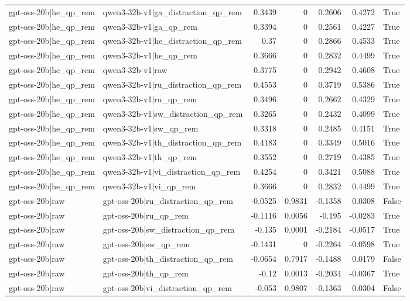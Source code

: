 \begin{table}
\begin{tabular}{l l r r r r l}
gpt-oss-20b|he_qp_rem & qwen3-32b-v1|ga_distraction_qp_rem & 0.3439 & 0 & 0.2606 & 0.4272 & True \\
gpt-oss-20b|he_qp_rem & qwen3-32b-v1|ga_qp_rem & 0.3394 & 0 & 0.2561 & 0.4227 & True \\
gpt-oss-20b|he_qp_rem & qwen3-32b-v1|he_distraction_qp_rem & 0.37 & 0 & 0.2866 & 0.4533 & True \\
gpt-oss-20b|he_qp_rem & qwen3-32b-v1|he_qp_rem & 0.3666 & 0 & 0.2832 & 0.4499 & True \\
gpt-oss-20b|he_qp_rem & qwen3-32b-v1|raw & 0.3775 & 0 & 0.2942 & 0.4608 & True \\
gpt-oss-20b|he_qp_rem & qwen3-32b-v1|ru_distraction_qp_rem & 0.4553 & 0 & 0.3719 & 0.5386 & True \\
gpt-oss-20b|he_qp_rem & qwen3-32b-v1|ru_qp_rem & 0.3496 & 0 & 0.2662 & 0.4329 & True \\
gpt-oss-20b|he_qp_rem & qwen3-32b-v1|sw_distraction_qp_rem & 0.3265 & 0 & 0.2432 & 0.4099 & True \\
gpt-oss-20b|he_qp_rem & qwen3-32b-v1|sw_qp_rem & 0.3318 & 0 & 0.2485 & 0.4151 & True \\
gpt-oss-20b|he_qp_rem & qwen3-32b-v1|th_distraction_qp_rem & 0.4183 & 0 & 0.3349 & 0.5016 & True \\
gpt-oss-20b|he_qp_rem & qwen3-32b-v1|th_qp_rem & 0.3552 & 0 & 0.2719 & 0.4385 & True \\
gpt-oss-20b|he_qp_rem & qwen3-32b-v1|vi_distraction_qp_rem & 0.4254 & 0 & 0.3421 & 0.5088 & True \\
gpt-oss-20b|he_qp_rem & qwen3-32b-v1|vi_qp_rem & 0.3666 & 0 & 0.2832 & 0.4499 & True \\
gpt-oss-20b|raw & gpt-oss-20b|ru_distraction_qp_rem & -0.0525 & 0.9831 & -0.1358 & 0.0308 & False \\
gpt-oss-20b|raw & gpt-oss-20b|ru_qp_rem & -0.1116 & 0.0056 & -0.195 & -0.0283 & True \\
gpt-oss-20b|raw & gpt-oss-20b|sw_distraction_qp_rem & -0.135 & 0.0001 & -0.2184 & -0.0517 & True \\
gpt-oss-20b|raw & gpt-oss-20b|sw_qp_rem & -0.1431 & 0 & -0.2264 & -0.0598 & True \\
gpt-oss-20b|raw & gpt-oss-20b|th_distraction_qp_rem & -0.0654 & 0.7917 & -0.1488 & 0.0179 & False \\
gpt-oss-20b|raw & gpt-oss-20b|th_qp_rem & -0.12 & 0.0013 & -0.2034 & -0.0367 & True \\
gpt-oss-20b|raw & gpt-oss-20b|vi_distraction_qp_rem & -0.053 & 0.9807 & -0.1363 & 0.0304 & False \\

\end{tabular}
\end{table}
